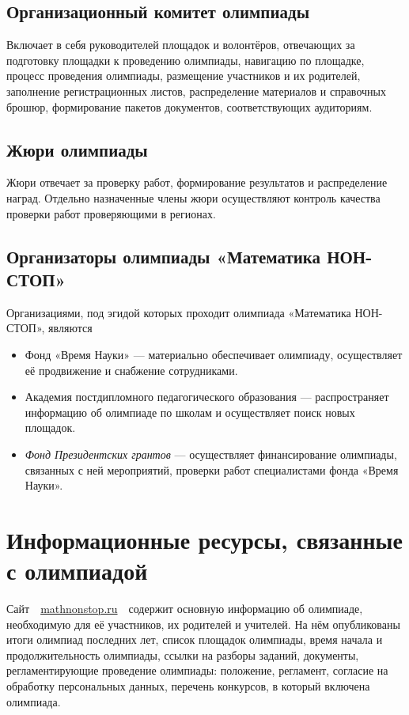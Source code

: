 \documentclass[a4paper,12pt]{article}
\newcommand{\mns}{«Математика НОН-СТОП»\xspace}
\begin{document}
\subsection{Организационный комитет олимпиады}

Включает в себя руководителей площадок и волонтёров, отвечающих за подготовку площадки к проведению олимпиады, навигацию по площадке, процесс проведения олимпиады, размещение участников и их родителей, заполнение регистрационных листов, распределение материалов и справочных брошюр, формирование пакетов документов, соответствующих аудиториям.

\subsection{Жюри олимпиады}

Жюри отвечает за проверку работ, формирование результатов и распределение наград.
Отдельно назначенные члены жюри осуществляют контроль качества проверки работ проверяющими в регионах.

\subsection{Организаторы олимпиады \mns}

Организациями, под эгидой которых проходит олимпиада \mns, являются \vspace{-4mm}

\begin{itemize}
\item Фонд «Время Науки» — материально обеспечивает олимпиаду, осуществляет её продвижение и снабжение сотрудниками.

\item Академия постдипломного педагогического образования — распространяет информацию об олимпиаде по школам и осуществляет поиск новых площадок.

\item {\itshape Фонд Президентских грантов} — осуществляет финансирование олимпиады, связанных с ней мероприятий, проверки работ специалистами фонда «Время Науки».
\end{itemize}

\section{Информационные ресурсы, связанные с олимпиадой}

Сайт\ \ \url{mathnonstop.ru}\ \ содержит основную информацию об олимпиаде, необходимую для её участников, их родителей и учителей. На нём опубликованы итоги олимпиад последних лет, список площадок олимпиады, время начала и продолжительность олимпиады, ссылки на разборы заданий, документы, регламентирующие проведение олимпиады: положение, регламент, согласие на обработку персональных данных, перечень конкурсов, в который включена олимпиада.
\end{document}

